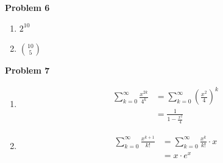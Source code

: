 \documentclass{article}
\begin{document}
\textbf{Problem 6} 
\begin{enumerate}[label=(\alph*)]
    \item $2^{10}$
    \item $10 \choose 5$
\end{enumerate}
\smallskip

\textbf{Problem 7} 
\begin{enumerate}[label=(\alph*)]
    \item 
    \begin{align}
        \sum_{k=0}^{\infty} \frac{x^{2k}}{4^{k}} 
        &= \sum_{k=0}^{\infty} \left(\frac{x^2}{4}\right)^{k}
        \\ &= \frac{1}{1 - \frac{x^2}{4}}
    \end{align}
    \item 
    \begin{align}
        \sum_{k=0}^{\infty} \frac{x^{k + 1}}{k!} &= \sum_{k=0}^{\infty} \frac{x^{k}}{k!} \cdot x
        \\ &= x \cdot e^{x} 
    \end{align}
\end{enumerate}
    
\end{document}
